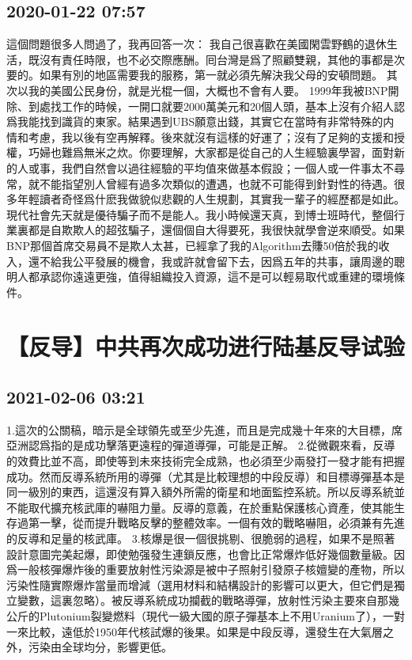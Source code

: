 \documentclass[twocolumn]{ctexart}
\begin{document}
\subsection*{2020-01-22 07:57}

這個問題很多人問過了，我再回答一次：
我自己很喜歡在美國閑雲野鶴的退休生活，既沒有責任時限，也不必交際應酬。囘台灣是爲了照顧雙親，其他的事都是次要的。如果有別的地區需要我的服務，第一就必須先解決我父母的安頓問題。
其次以我的美國公民身份，就是光棍一個，大概也不會有人要。
1999年我被BNP開除、到處找工作的時候，一開口就要2000萬美元和20個人頭，基本上沒有介紹人認爲我能找到識貨的東家。結果遇到UBS願意出錢，其實它在當時有非常特殊的内情和考慮，我以後有空再解釋。後來就沒有這樣的好運了；沒有了足夠的支援和授權，巧婦也難爲無米之炊。你要理解，大家都是從自己的人生經驗裏學習，面對新的人或事，我們自然會以過往經驗的平均值來做基本假設；一個人或一件事太不尋常，就不能指望別人曾經有過多次類似的遭遇，也就不可能得到針對性的待遇。很多年輕讀者奇怪爲什麽我做貌似悲觀的人生規劃，其實我一輩子的經歷都是如此。現代社會先天就是優待騙子而不是能人。我小時候還天真，到博士班時代，整個行業裏都是自欺欺人的超弦騙子，還個個自大得要死，我很快就學會逆來順受。如果BNP那個首席交易員不是欺人太甚，已經拿了我的Algorithm去賺50倍於我的收入，還不給我公平發展的機會，我或許就會留下去，因爲五年的共事，讓周邊的聰明人都承認你遠遠更強，值得組織投入資源，這不是可以輕易取代或重建的環境條件。
\section*{【反导】中共再次成功进行陆基反导试验}
\subsection*{2021-02-06 03:21}

1.這次的公關稿，暗示是全球領先或至少先進，而且是完成幾十年來的大目標，席亞洲認爲指的是成功擊落更遠程的彈道導彈，可能是正解。
2.從微觀來看，反導的效費比並不高，即使等到未來技術完全成熟，也必須至少兩發打一發才能有把握成功。然而反導系統所用的導彈（尤其是比較理想的中段反導）和目標導彈基本是同一級別的東西，這還沒有算入額外所需的衛星和地面監控系統。所以反導系統並不能取代擴充核武庫的嚇阻力量。反導的意義，在於重點保護核心資產，使其能生存過第一擊，從而提升戰略反擊的整體效率。一個有效的戰略嚇阻，必須兼有先進的反導和足量的核武庫。
3.核爆是很一個很挑剔、很脆弱的過程，如果不是照著設計意圖完美起爆，即使勉强發生連鎖反應，也會比正常爆炸低好幾個數量級。因爲一般核彈爆炸後的重要放射性污染源是被中子照射引發原子核嬗變的產物，所以污染性隨實際爆炸當量而增減（選用材料和結構設計的影響可以更大，但它們是獨立變數，這裏忽略）。被反導系統成功攔截的戰略導彈，放射性污染主要來自那幾公斤的Plutonium裂變燃料（現代一級大國的原子彈基本上不用Uranium了），一對一來比較，遠低於1950年代核試爆的後果。如果是中段反導，還發生在大氣層之外，污染由全球均分，影響更低。
\end{document}
